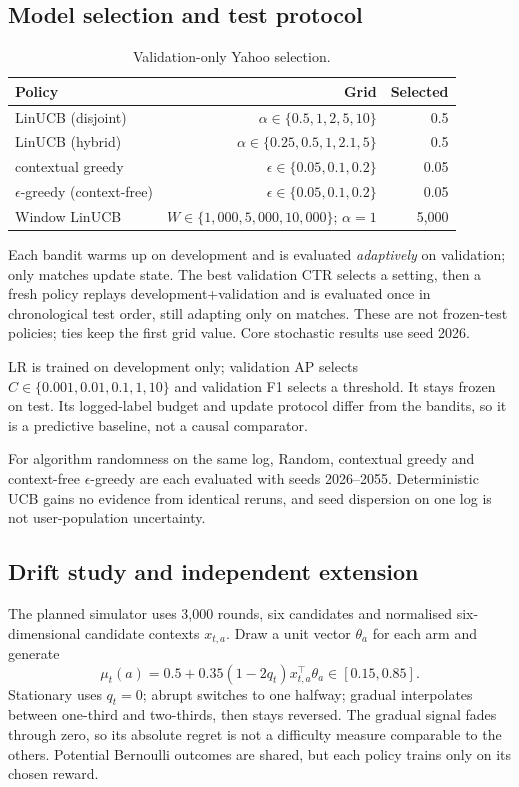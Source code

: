 \documentclass[10pt,a4paper]{article}
\begin{document}
\subsection{Model selection and test protocol}
\begin{table}[htbp]\centering\small\caption{Validation-only Yahoo selection.}\begin{tabular}{lrr}
\toprule
Policy & Grid & Selected \\ \midrule
LinUCB (disjoint) & $\alpha\in\{0.5,1,2,5,10\}$ & 0.5 \\
LinUCB (hybrid) & $\alpha\in\{0.25,0.5,1,2.1,5\}$ & 0.5 \\
contextual greedy & $\epsilon\in\{0.05,0.1,0.2\}$ & 0.05 \\
$\epsilon$-greedy (context-free) & $\epsilon\in\{0.05,0.1,0.2\}$ & 0.05 \\
Window LinUCB & $W\in\{1,000,5,000,10,000\}$; $\alpha=1$ & 5,000 \\
\bottomrule\end{tabular}\end{table}

Each bandit warms up on development and is evaluated \emph{adaptively} on
validation; only matches update state. The best validation CTR selects a
setting, then a fresh policy replays development+validation and is
evaluated once in chronological test order, still adapting only on
matches. These are not frozen-test policies; ties keep the first grid
value. Core stochastic results use seed 2026.

LR is trained on development only; validation AP selects
$C\in\{0.001,0.01,0.1,1,10\}$ and validation F1 selects a threshold. It
stays frozen on test. Its logged-label budget and update protocol differ
from the bandits, so it is a predictive baseline, not a causal comparator.

For algorithm randomness on the same log, Random, contextual greedy and
context-free $\epsilon$-greedy are each evaluated with seeds 2026--2055.
Deterministic UCB gains no evidence from identical reruns, and seed
dispersion on one log is not user-population uncertainty.

\subsection{Drift study and independent extension}
The planned simulator uses 3,000 rounds, six candidates and normalised
six-dimensional candidate contexts $x_{t,a}$. Draw a unit vector
$\theta_a$ for each arm and generate
\begin{equation}
\mu_t(a)=0.5+0.35(1-2q_t)x_{t,a}^\top\theta_a\in[0.15,0.85].
\label{eq:sim}
\end{equation}
Stationary uses $q_t=0$; abrupt switches to one halfway; gradual
interpolates between one-third and two-thirds, then stays reversed. The
gradual signal fades through zero, so its absolute regret is not a
difficulty measure comparable to the others. Potential Bernoulli outcomes
are shared, but each policy trains only on its chosen reward.
\end{document}
